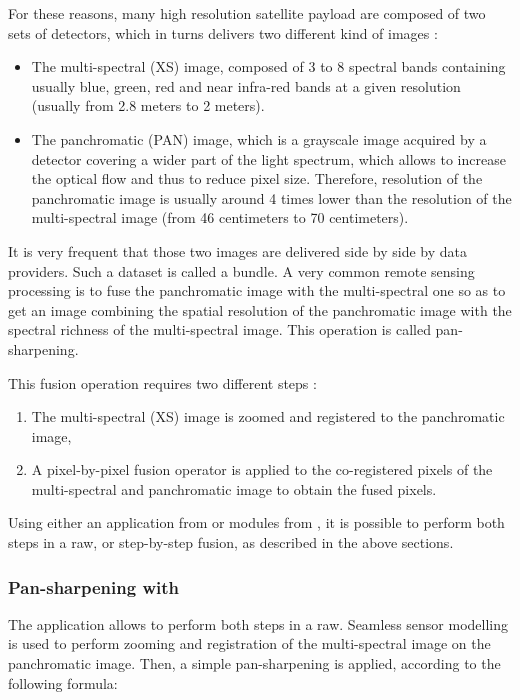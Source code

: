 For these reasons, many high resolution satellite payload are composed
of two sets of detectors, which in turns delivers two different kind
of images :

\begin{itemize}
\item The multi-spectral (XS) image, composed of 3 to 8 spectral bands
  containing usually blue, green, red and near infra-red bands at a
  given resolution (usually from 2.8 meters to 2 meters).
\item The panchromatic (PAN) image, which is a grayscale image acquired by a
  detector covering a wider part of the light spectrum, which allows
  to increase the optical flow and thus to reduce pixel
  size. Therefore, resolution of the panchromatic image is usually
  around 4 times lower than the resolution of the multi-spectral image
  (from 46 centimeters to 70 centimeters).
\end{itemize}

It is very frequent that those two images are delivered side by side
by data providers. Such a dataset is called a bundle. A very common
remote sensing processing is to fuse the panchromatic image with the
multi-spectral one so as to get an image combining the spatial
resolution of the panchromatic image with the spectral richness of the
multi-spectral image. This operation is called pan-sharpening.

This fusion operation requires two different steps :
\begin{enumerate}
\item The multi-spectral (XS) image is zoomed and registered to the
  panchromatic image,
\item A pixel-by-pixel fusion operator is applied to the co-registered
  pixels of the multi-spectral and panchromatic image to obtain the
  fused pixels.
\end{enumerate}

Using either an application from \app or modules from \mont, it is
possible to perform both steps in a raw, or step-by-step fusion, as
described in the above sections.

\subsubsection{Pan-sharpening with \app}

The  application allows to
perform both steps in a raw. Seamless sensor modelling is used to
perform zooming and registration of the multi-spectral image on the
panchromatic image. Then, a simple pan-sharpening is applied,
according to the following formula:


